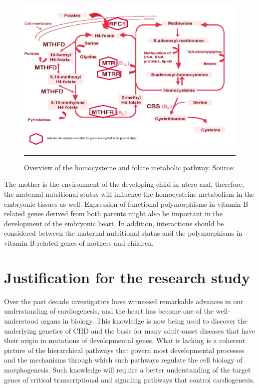 \begin{refsection}
\begin{figure}[!tb]
\centering
\includegraphics[scale=1.5,keepaspectratio]{Figures/Figure1_6.pdf}
\rule{35em}{0.5pt}
\caption[Overview of the homocysteine and folate metabolic pathway]{Overview of the homocysteine and folate metabolic pathway. Source: \cite{fowler2001folate}}
\label{fig:1_6}
\end{figure}

The mother is the environment of the developing child in utero and, therefore, the maternal nutritional status will influence the homocysteine metabolism in the embryonic tissues as well. Expression of functional polymorphisms in vitamin B related genes derived from both parents might also be important in the development of the embryonic heart. In addition, interactions should be considered between the maternal nutritional status and the polymorphisms in vitamin B related genes of mothers and children. 

\section{Justification for the research study}

Over the past decade investigators have witnessed remarkable advances in our understanding of cardiogenesis, and the heart has become one of the well-understood organs in biology. This knowledge is now being used to discover the underlying genetics of CHD and the basis for many adult-onset diseases that have their origin in mutations of developmental genes. What is lacking is a coherent picture of the hierarchical pathways that govern most developmental processes and the mechanisms through which such pathways regulate the cell biology of morphogenesis. Such knowledge will require a better understanding of the target genes of critical transcriptional and signaling pathways that control cardiogenesis. 


\end{refsection}
